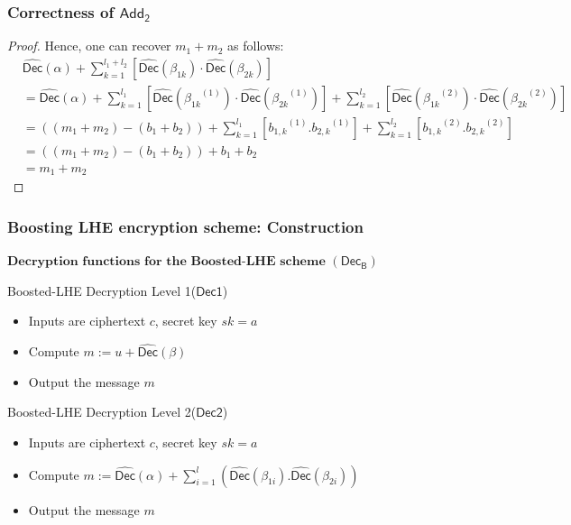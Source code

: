 \documentclass{beamer}
\begin{document}
\begin{frame}
\frametitle{Correctness of $\mathsf{Add_2}$}
\begin{proof}

Hence, one can recover $m_1+m_2$ as follows:
\begin{align*}
& \widehat{\mathsf{Dec}}(\alpha)+ \sum_{k=1}^{l_1+l_2}[\widehat{\mathsf{Dec}}(\beta_{1k})\cdot \widehat{\mathsf{Dec}}(\beta_{2k})]\nonumber \\& =\widehat{\mathsf{Dec}}(\alpha)+\sum_{k=1}^{l_1}[\widehat{\mathsf{Dec}}({\beta_{1k}}^{(1)})\cdot \widehat{\mathsf{Dec}}({\beta_{2k}}^{(1)})]+\sum_{k=1}^{l_2}[\widehat{\mathsf{Dec}}({\beta_{1k}}^{(2)})\cdot \widehat{\mathsf{Dec}}({\beta_{2k}}^{(2)})]\nonumber \\
&= ((m_1+m_2)-(b_1+b_2))+\sum_{k=1}^{l_1}[{b_{1,k}}^{(1)}.{b_{2,k}}^{(1)}]+\sum_{k=1}^{l_2}[{b_{1,k}}^{(2)}.{b_{2,k}}^{(2)}]\nonumber\\ 
&= ((m_1+m_2)-(b_1+b_2))+b_1+b_2 \nonumber \\
&= m_1+m_2 \nonumber
\end{align*}
\end{proof}
\end{frame}

\begin{frame}[t]
\frametitle{Boosting LHE encryption scheme: Construction}
$\textbf{Decryption functions for the Boosted-LHE scheme}$ $(\mathsf{Dec_B})$

\begin{block}{Boosted-LHE Decryption Level 1($\mathsf{Dec1}$)}
\begin{itemize}
\item Inputs are ciphertext $c$, secret key $sk=a$
\item Compute  $m := u+\widehat{\mathsf{Dec}}(\beta)$
\item Output the message $m$
\end{itemize} 
\end{block}
\vspace*{3mm}
\begin{block}{Boosted-LHE Decryption Level 2($\mathsf{Dec2}$)}
\begin{itemize}
\item Inputs are ciphertext $c$, secret key $sk=a$
\item Compute  $m := \widehat{\mathsf{Dec}}(\alpha)+\sum_{i=1}^l( \widehat{\mathsf{Dec}}(\beta_{1i} ). \widehat{\mathsf{Dec}}(\beta_{2i} ))$
\item Output the message $m$
\end{itemize} 
\end{block}
\end{frame}
\end{document}
